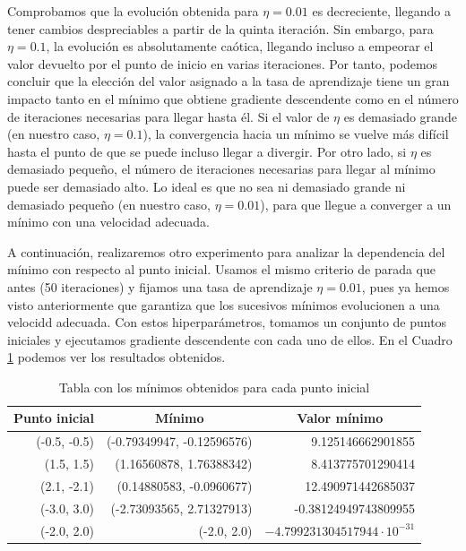 \documentclass[10pt,a4paper]{article}
\begin{document}
Comprobamos que la evolución obtenida para $\eta = 0.01$ es decreciente, llegando a tener cambios despreciables a partir de la quinta iteración. Sin embargo, para $\eta = 0.1$, la evolución es absolutamente caótica, llegando incluso a empeorar el valor devuelto por el punto de inicio en varias iteraciones. Por tanto, podemos concluir que la elección del valor asignado a la tasa de aprendizaje tiene un gran impacto tanto en el mínimo que obtiene gradiente descendente como en el número de iteraciones necesarias para llegar hasta él. Si el valor de $\eta$ es demasiado grande (en nuestro caso, $\eta = 0.1$), la convergencia hacia un mínimo se vuelve más difícil hasta el punto de que se puede incluso llegar a divergir. Por otro lado, si $\eta$ es demasiado pequeño, el número de iteraciones necesarias para llegar al mínimo puede ser demasiado alto. Lo ideal es que no sea ni demasiado grande ni demasiado pequeño (en nuestro caso, $\eta = 0.01$), para que llegue a converger a un mínimo con una velocidad adecuada.

A continuación, realizaremos otro experimento para analizar la dependencia del mínimo con respecto al punto inicial. Usamos el mismo criterio de parada que antes (50 iteraciones) y fijamos una tasa de aprendizaje $\eta = 0.01$, pues ya hemos visto anteriormente que garantiza que los sucesivos mínimos evolucionen a una velocidd adecuada. Con estos hiperparámetros, tomamos un conjunto de puntos iniciales y ejecutamos gradiente descendente con cada uno de ellos. En el Cuadro \ref{fig:ej1.3_puntos_iniciales} podemos ver los resultados obtenidos.

\begin{table}[]
	\centering
	\begin{tabular}{|r|r|r|}
		\hline
		\multicolumn{1}{|c|}{\textbf{Punto inicial}} & \multicolumn{1}{c|}{\textbf{Mínimo}} & \multicolumn{1}{c|}{\textbf{Valor mínimo}}                          \\ \hline
		(-0.5, -0.5)                                 & (-0.79349947, -0.12596576)           & 9.125146662901855                                                   \\ \hline
		(1.5, 1.5)                                   & (1.16560878, 1.76388342)             & 8.413775701290414                                                   \\ \hline
		(2.1, -2.1)                                  & (0.14880583, -0.0960677)             & 12.490971442685037                                                  \\ \hline
		(-3.0, 3.0)                                  & (-2.73093565, 2.71327913)            & -0.38124949743809955                                                \\ \hline
		(-2.0, 2.0)                                  & (-2.0, 2.0)                          & $-4.799231304517944 \cdot 10^{-31}$                                 \\ \hline
	\end{tabular}
	\caption{Tabla con los mínimos obtenidos para cada punto inicial}
	\label{fig:ej1.3_puntos_iniciales}
\end{table}
\end{document}
